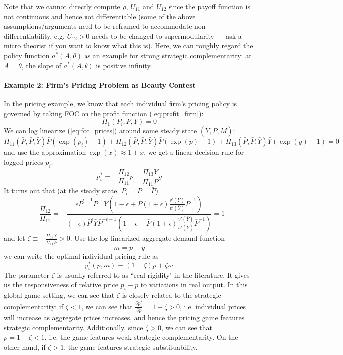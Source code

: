 \documentclass[12pt]{article}
\begin{document}
Note that we cannot directly compute $\rho$, $U_{11}$ and $U_{12}$ since the payoff function is not continuous and hence not differentiable (some of the above assumptions/arguments need to be reframed to accommodate non-differentiability, e.g. $U_{12} > 0$ needs to be changed to supermodularity --- ask a micro theorist if you want to know what this is). Here, we can roughly regard the policy function $a^*(A, \theta)$ as an example for strong strategic complementarity: at $A = \theta$, the slope of $a^*(A, \theta)$ is positive infinity.

\paragraph{Example 2: Firm's Pricing Problem as Beauty Contest \\ [6pt]}

In the pricing example, we know that each individual firm's pricing policy is governed by taking FOC on the profit function (\ref{eq:profit_firm}):
\begin{equation} \label{eq:foc_prices}
	\Pi_1(P_i, P, Y) = 0
\end{equation}
We can log linearize (\ref{eq:foc_prices}) around some steady state $(\bar{Y}, \bar{P}, \bar{M})$:
\[\Pi_{11}(\bar{P}, \bar{P}, \bar{Y}) \bar{P} (\exp(p_i) - 1) + \Pi_{12}(\bar{P}, \bar{P}, \bar{Y}) \bar{P} (\exp(p) - 1) + \Pi_{13}(\bar{P}, \bar{P}, \bar{Y}) \bar{Y} (\exp(y) - 1) = 0  \]
and use the approximation $\exp(x) \approx 1 + x$, we get a linear decision rule for logged prices $p_i$:
\[p_i^* = - \frac{\Pi_{12}}{\Pi_{11}} p - \frac{\Pi_{13}\bar{Y}}{\Pi_{11}\bar{P}} y\]
It turns out that (at the steady state, $P_i = P = \bar{P}$)
\[- \frac{\Pi_{12}}{\Pi_{11}} = -\frac{\epsilon \bar{P}^{\epsilon-1} \bar{P}^{-\epsilon} \bar{Y} (1-\epsilon + \bar{P} (1+\epsilon) \frac{v'(\bar{Y})}{u'(\bar{Y})} \bar{P}^{-1})}{(-\epsilon) \bar{P}^\epsilon \bar{Y} \bar{P}^{-\epsilon -1} (1-\epsilon + \bar{P} (1+\epsilon) \frac{v'(\bar{Y})}{u'(\bar{Y})} \bar{P}^{-1}) } = 1\]
and let $\zeta \equiv -\frac{\Pi_{13}\bar{Y}}{\Pi_{11}\bar{P}} > 0$. Use the log-linearized aggregate demand function 
\[m = p + y\]
we can write the optimal individual pricing rule as
\begin{equation} \label{eq:linear_dr}
	p_i^*(p, m) = (1-\zeta) p + \zeta m
\end{equation}
The parameter $\zeta$ is usually referred to as ``real rigidity" in the literature. It gives us the responsiveness of relative price $p_i - p$ to variations in real output. In this global game setting, we can see that $\zeta$ is closely related to the strategic complementarity: if $\zeta < 1$, we can see that $\frac{\partial p_i^*}{\partial p} = 1- \zeta > 0$, i.e. individual prices will increase as aggregate prices increases, and hence the pricing game features strategic complementarity. Additionally, since $\zeta >0$, we can see that $\rho = 1 - \zeta < 1$, i.e. the game features weak strategic complementarity. On the other hand, if $\zeta > 1$, the game features strategic substituability. 
\end{document}
